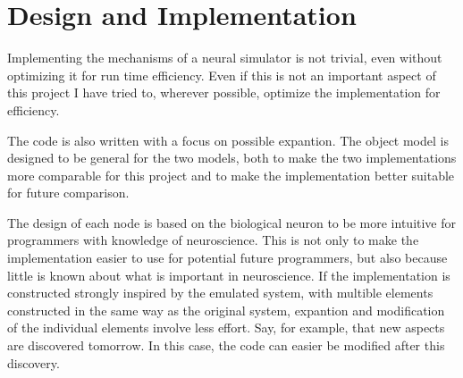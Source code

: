 \documentclass[b5paper,11 pt]{report}
\begin{document}
	
	
\chapter{Design and Implementation} %
Implementing the mechanisms of a neural simulator is not trivial, even without optimizing it for run time efficiency.
Even if this is not an important aspect of this project I have tried to, wherever possible, optimize the implementation for efficiency.


The code is also written with a focus on possible expantion. %
The object model is designed to be general for the two models, both to make the two implementations more comparable for this project and to make the implementation better suitable for future comparison.

The design of each node is based on the biological neuron to be more intuitive for programmers with knowledge of neuroscience. 
This is not only to make the implementation easier to use for potential future programmers, but also because little is known about what is important in neuroscience.
If the implementation is constructed strongly inspired by the emulated system, with multible elements constructed in the same way as the original system, expantion and modification of the individual elements involve less effort.
Say, for example, that new aspects are discovered tomorrow. In this case, the code can easier be modified after this discovery.
\end{document}
